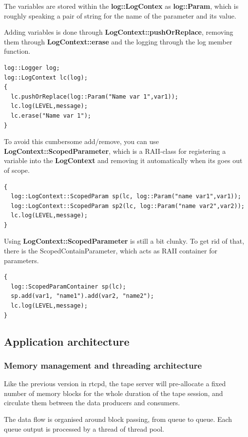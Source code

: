The variables are stored within the \textbf{log::LogContex} as \textbf{log::Param}, which is roughly speaking a pair of string 
for the name of the parameter and its value.

Adding variables is done through \textbf{LogContext::pushOrReplace}, removing them through \textbf{LogContext::erase} and the 
logging through the log member function.
\begin{table}[h]
\begin{lstlisting}
log::Logger log;
log::LogContext lc(log);
{
  lc.pushOrReplace(log::Param("Name var 1",var1));
  lc.log(LEVEL,message);
  lc.erase("Name var 1");
}
\end{lstlisting}
\end{table}
To avoid this cumbersome add/remove, you can use \textbf{LogContext::ScopedParameter}, which is 
a RAII-class for registering a variable into the \textbf{LogContext} and removing it automatically when its goes out of scope.
\begin{table}[h]
\begin{lstlisting}
{
  log::LogContext::ScopedParam sp(lc, log::Param("name var1",var1));
  log::LogContext::ScopedParam sp2(lc, log::Param("name var2",var2));
  lc.log(LEVEL,message);
}
\end{lstlisting}
\end{table}
Using \textbf{LogContext::ScopedParameter} is still a bit clunky. To get rid of that, there is the 
ScopedContainParameter, which acts as RAII container for parameters.
\begin{table}[h]
\begin{lstlisting}
{
  log::ScopedParamContainer sp(lc);
  sp.add(var1, "name1").add(var2, "name2");
  lc.log(LEVEL,message);
}
\end{lstlisting}
\end{table}
\subsection{Application architecture}
\subsubsection{Memory management and threading architecture}
Like the previous version in rtcpd, the tape server will pre-allocate a fixed number of memory
blocks for the whole duration of the tape session, and circulate them between the data producers 
and consumers.

The data flow is organised around block passing, from queue to queue. Each queue output is processed
by a thread of thread pool.

